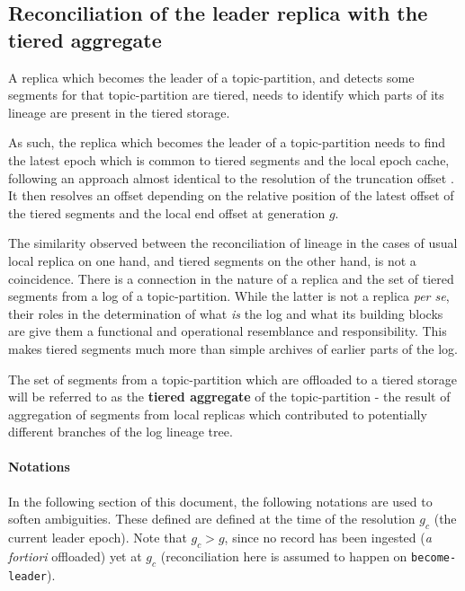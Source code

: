 \documentclass{article}
\begin{document}
\subsection{Reconciliation of the leader replica with the tiered aggregate}

A replica which becomes the leader of a topic-partition, and detects some segments for that topic-partition are tiered, needs to identify which parts of its lineage are present in the tiered storage. 

As such, the replica which becomes the leader of a topic-partition needs to find the latest epoch which is common to tiered segments and the local epoch cache, following an approach almost identical to the resolution of the truncation offset \cite{KIP279}. It then resolves an offset depending on the relative position of the latest offset of the tiered segments and the local end offset at generation $g$.

The similarity observed between the reconciliation of lineage in the cases of usual local replica on one hand, and tiered segments on the other hand, is not a coincidence. There is a connection in the nature of a replica and the set of tiered segments from a log of a topic-partition. While the latter is not a replica \textit{per se}, their roles in the determination of what \textit{is} the log and what its building blocks are give them a functional and operational resemblance and responsibility. This makes tiered segments much more than simple archives of earlier parts of the log.

The set of segments from a topic-partition which are offloaded to a tiered storage will be referred to as the \textbf{tiered aggregate} of the topic-partition - the result of aggregation of segments from local replicas which contributed to potentially different branches of the log lineage tree.

\paragraph{Notations}
In the following section of this document, the following notations are used to soften ambiguities. These defined are defined at the time of the resolution $g_c$ (the current leader epoch). Note that $g_c > g$, since no record has been ingested (\textit{a fortiori} offloaded) yet at $g_c$ (reconciliation here is assumed to happen on \texttt{become-leader}).
\end{document}
